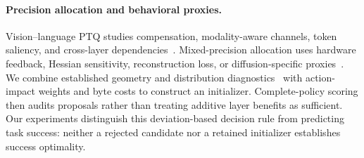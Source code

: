 \paragraph{Precision allocation and behavioral proxies.}
Vision--language PTQ studies compensation, modality-aware channels, token saliency, and cross-layer dependencies~\cite{deng2026vlmptq,xue2026vlmq,wang2024qvlm,wang2026bivlm}. Mixed-precision allocation uses hardware feedback, Hessian sensitivity, reconstruction loss, or diffusion-specific proxies~\cite{wang2019haq,wang2019hawq,dong2020hawqv2,hubara2021accurate,li2021brecq,zhao2024mixdq}. We combine established geometry and distribution diagnostics~\cite{kornblith2019similarity,yin2026csaligner} with action-impact weights and byte costs to construct an initializer. Complete-policy scoring then audits proposals rather than treating additive layer benefits as sufficient. Our experiments distinguish this deviation-based decision rule from predicting task success: neither a rejected candidate nor a retained initializer establishes success optimality.